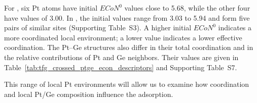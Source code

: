 For , six Pt atoms have initial $ECoN^{0}$ values close to 5.68, while the other four have values of 3.00. In , the initial values range from 3.03 to 5.94 and form five pairs of similar sites (Supporting Table~S3). A higher initial $ECoN^{0}$ indicates a more 
coordinated local environment; a lower value indicates a lower effective coordination. The Pt--Ge structures also differ in their total coordination
and in the relative contributions of Pt and Ge neighbors. Their values are
given in Table~\ref{tab:tfg_crossed_ptge_econ_descriptors} and Supporting
Table~S7.

This range of local Pt environments will allow us to examine how coordination
and local Pt/Ge composition influence the  adsorption.
